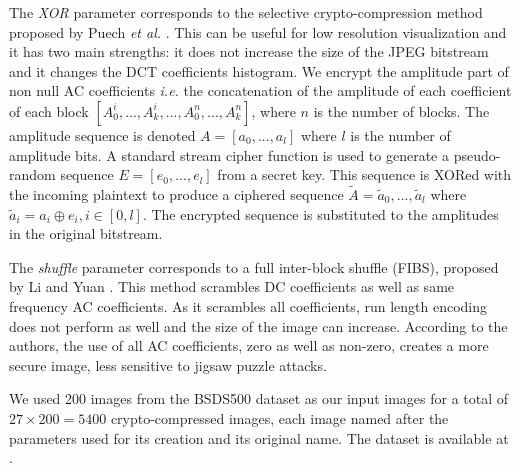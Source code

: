 \documentclass{article}
\begin{document}

The \textit{XOR} parameter corresponds to the selective crypto-compression method proposed by Puech \textit{et al.} \cite{fernandez2012advanced}. This can be useful for low resolution visualization and it has two main strengths: it does not increase the size of the JPEG bitstream and it changes the DCT coefficients histogram. We encrypt the amplitude part of non null AC coefficients \textit{i.e.} the concatenation of the amplitude of each coefficient of each block $[A_0^i,..., A_k^i,..., A_0^n,..., A_k^n]$, where $n$ is the number of blocks. The amplitude sequence is denoted $A = [a_0,..., a_l]$ where $l$ is the number of amplitude bits. A standard stream cipher function is used to generate a pseudo-random sequence $E = [e_0,..., e_l]$ from a secret key. This sequence is XORed with the incoming plaintext to produce a ciphered sequence $\widetilde{A} = \widetilde{a}_0,..., \widetilde{a}_l$ where $\widetilde{a}_i = a_i \oplus e_i, i \in [0,l]$. The encrypted sequence is substituted to the amplitudes in the original bitstream.

The \textit{shuffle} parameter corresponds to a full inter-block shuffle (FIBS), proposed by Li and Yuan \cite{li2007leak}. This method scrambles DC coefficients as well as same frequency AC coefficients. As it scrambles all coefficients, run length encoding does not perform as well and the size of the image can increase. According to the authors, the use of all AC coefficients, zero as well as non-zero, creates a more secure image, less sensitive to jigsaw puzzle attacks.

We used 200 images from the BSDS500 \cite{amfm_pami2011} dataset as our input images for a total of $27 \times 200 = 5400$ crypto-compressed images, each image named after the parameters used for its creation and its original name. The dataset is available at \cite{}.

\end{document}
